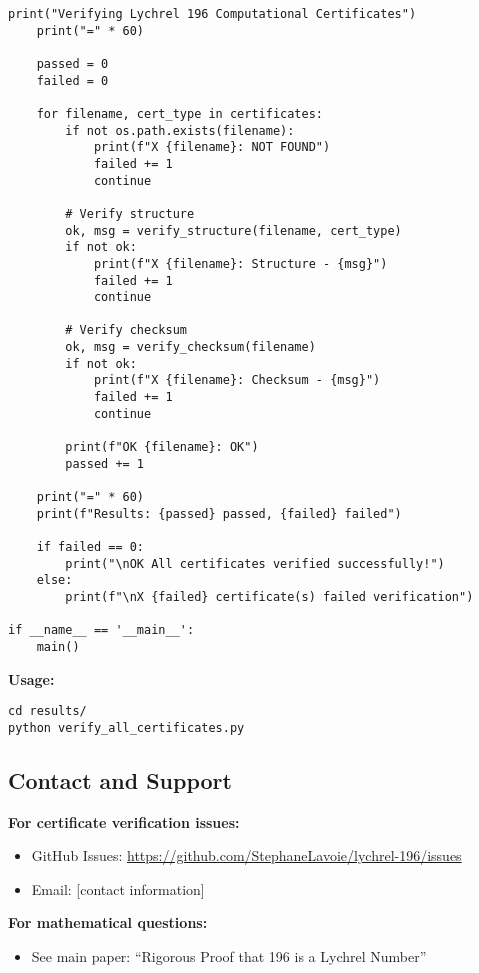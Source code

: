 \documentclass[11pt,a4paper]{article}
\theoremstyle{definition}
\begin{document}
\begin{lstlisting}[style=pythonstyle, caption={Complete Certificate Verification Script}]
    print("Verifying Lychrel 196 Computational Certificates")
    print("=" * 60)
    
    passed = 0
    failed = 0
    
    for filename, cert_type in certificates:
        if not os.path.exists(filename):
            print(f"X {filename}: NOT FOUND")
            failed += 1
            continue
        
        # Verify structure
        ok, msg = verify_structure(filename, cert_type)
        if not ok:
            print(f"X {filename}: Structure - {msg}")
            failed += 1
            continue
        
        # Verify checksum
        ok, msg = verify_checksum(filename)
        if not ok:
            print(f"X {filename}: Checksum - {msg}")
            failed += 1
            continue
        
        print(f"OK {filename}: OK")
        passed += 1
    
    print("=" * 60)
    print(f"Results: {passed} passed, {failed} failed")
    
    if failed == 0:
        print("\nOK All certificates verified successfully!")
    else:
        print(f"\nX {failed} certificate(s) failed verification")

if __name__ == '__main__':
    main()
\end{lstlisting}

\textbf{Usage:}

\begin{lstlisting}[style=bashstyle]
cd results/
python verify_all_certificates.py
\end{lstlisting}

\subsection{Contact and Support}

\textbf{For certificate verification issues:}
\begin{itemize}
    \item GitHub Issues: \url{https://github.com/StephaneLavoie/lychrel-196/issues}
    \item Email: [contact information]
\end{itemize}

\textbf{For mathematical questions:}
\begin{itemize}
    \item See main paper: ``Rigorous Proof that 196 is a Lychrel Number''
\end{itemize}
\end{document}
